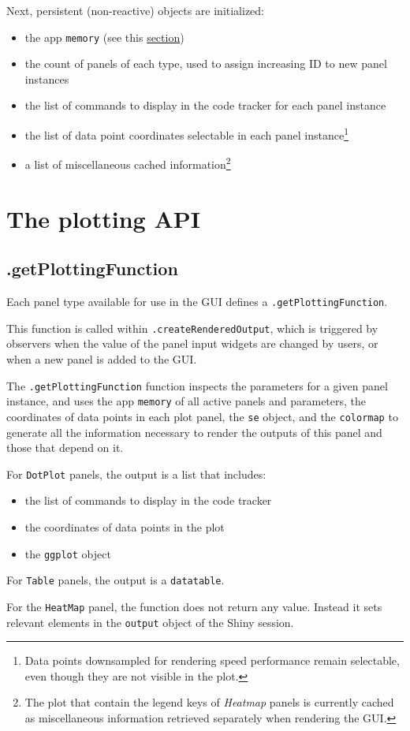 \documentclass[]{book}
\providecommand{\tightlist}{%
  \setlength{\itemsep}{0pt}\setlength{\parskip}{0pt}}
\let\rmarkdownfootnote\footnote%
\def\footnote{\protect\rmarkdownfootnote}
\begin{document}
Next, persistent (non-reactive) objects are initialized:

\begin{itemize}
\tightlist
\item
  the app \texttt{memory} (see this \protect\hyperlink{memory}{section})
\item
  the count of panels of each type, used to assign increasing ID to new panel instances
\item
  the list of commands to display in the code tracker for each panel instance
\item
  the list of data point coordinates selectable in each panel instance\footnote{Data points downsampled for rendering speed performance remain selectable, even though they are not visible in the plot.}
\item
  a list of miscellaneous cached information\footnote{The plot that contain the legend keys of \emph{Heatmap} panels is currently cached as miscellaneous information retrieved separately when rendering the GUI.}
\end{itemize}

\hypertarget{the-plotting-api}{%
\chapter{The plotting API}\label{the-plotting-api}}

\hypertarget{getplottingfunction}{%
\section{.getPlottingFunction}\label{getplottingfunction}}

Each panel type available for use in the GUI defines a \texttt{.getPlottingFunction}.

This function is called within \texttt{.createRenderedOutput}, which is triggered by observers when the value of the panel input widgets are changed by users, or when a new panel is added to the GUI.

The \texttt{.getPlottingFunction} function inspects the parameters for a given panel instance, and uses the app \texttt{memory} of all active panels and parameters, the coordinates of data points in each plot panel, the \texttt{se} object, and the \texttt{colormap} to generate all the information necessary to render the outputs of this panel and those that depend on it.

For \texttt{DotPlot} panels, the output is a list that includes:

\begin{itemize}
\tightlist
\item
  the list of commands to display in the code tracker
\item
  the coordinates of data points in the plot
\item
  the \texttt{ggplot} object
\end{itemize}

For \texttt{Table} panels, the output is a \texttt{datatable}.

For the \texttt{HeatMap} panel, the function does not return any value.
Instead it sets relevant elements in the \texttt{output} object of the Shiny session.


\end{document}
